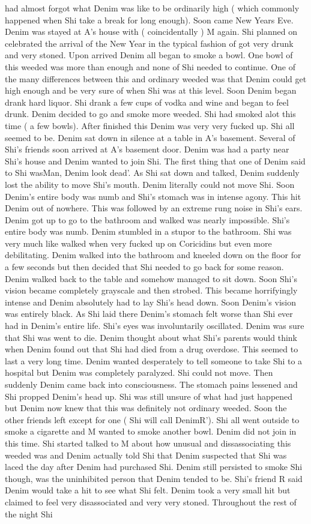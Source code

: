 \documentclass[12pt]{book}
\begin{document}
had almost forgot what Denim was like to be ordinarily high ( which commonly happened when Shi take a break for long enough). Soon came New Years Eve. Denim was stayed at A's house with ( coincidentally ) M again. Shi planned on celebrated the arrival of the New Year in the typical fashion of got very drunk and very stoned. Upon arrived Denim all began to smoke a bowl. One bowl of this weeded was more than enough and none of Shi needed to continue. One of the many differences between this and ordinary weeded was that Denim could get high enough and be very sure of when Shi was at this level. Soon Denim began drank hard liquor. Shi drank a few cups of vodka and wine and began to feel drunk. Denim decided to go and smoke more weeded. Shi had smoked alot this time ( a few bowls). After finished this Denim was very very fucked up. Shi all seemed to be. Denim sat down in silence at a table in A's basement. Several of Shi's friends soon arrived at A's basement door. Denim was had a party near Shi's house and Denim wanted to join Shi. The first thing that one of Denim said to Shi wasMan, Denim look dead'. As Shi sat down and talked, Denim suddenly lost the ability to move Shi's mouth. Denim literally could not move Shi. Soon Denim's entire body was numb and Shi's stomach was in intense agony. This hit Denim out of nowhere. This was followed by an extreme rung noise in Shi's ears. Denim got up to go to the bathroom and walked was nearly impossible. Shi's entire body was numb. Denim stumbled in a stupor to the bathroom. Shi was very much like walked when very fucked up on Coricidins but even more debilitating. Denim walked into the bathroom and kneeled down on the floor for a few seconds but then decided that Shi needed to go back for some reason. Denim walked back to the table and somehow managed to sit down. Soon Shi's vision became completely grayscale and then strobed. This became horrifyingly intense and Denim absolutely had to lay Shi's head down. Soon Denim's vision was entirely black. As Shi laid there Denim's stomach felt worse than Shi ever had in Denim's entire life. Shi's eyes was involuntarily oscillated. Denim was sure that Shi was went to die. Denim thought about what Shi's parents would think when Denim found out that Shi had died from a drug overdose. This seemed to last a very long time. Denim wanted desperately to tell someone to take Shi to a hospital but Denim was completely paralyzed. Shi could not move. Then suddenly Denim came back into consciousness. The stomach pains lessened and Shi propped Denim's head up. Shi was still unsure of what had just happened but Denim now knew that this was definitely not ordinary weeded. Soon the other friends left except for one ( Shi will call DenimR'). Shi all went outside to smoke a cigarette and M wanted to smoke another bowl. Denim did not join in this time. Shi started talked to M about how unusual and dissassociating this weeded was and Denim actually told Shi that Denim suspected that Shi was laced the day after Denim had purchased Shi. Denim still persisted to smoke Shi though, was the uninhibited person that Denim tended to be. Shi's friend R said Denim would take a hit to see what Shi felt. Denim took a very small hit but claimed to feel very disassociated and very very stoned. Throughout the rest of the night Shi 
\end{document}
